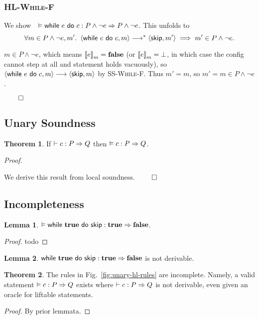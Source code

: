 \documentclass[10pt]{article}
\theoremstyle{definition}
\newtheorem{theorem}{Theorem}
\newtheorem{lemma}{Lemma}
\begin{document}
\subsubsection*{\textsc{HL-While-F}}
We show~~$\VAL \Triple \While e do c : P \wedge \neg e => P \wedge \neg e$.
This unfolds to
$$\forall m \in P \wedge \neg e, m'.\
\Cfg(\While e do c,m) \sstepstotrans \Cfg(\Skip,m') \implies
m' \in P \wedge \neg e.$$

$m \in P \wedge \neg e$, which means $\Eval(e,m) = \False$
(or $\Eval(e,m) = \bot$, in which case the config cannot step at all and statement holds vacuously),
so $\Cfg(\While e do c,m) \sstepsto \Cfg(\Skip,m)$ by \textsc{SS-While-F}.
Thus $m' = m$, so $m' = m \in P \wedge \neg e$.


\hfill $\qed$

\subsection*{Unary Soundness}
\begin{theorem}
If $\DER \Triple c : P => Q$ then $\VAL \Triple c : P => Q$.
\end{theorem}

\noindent
\emph{Proof.}

\noindent
We derive this result from local soundness.
\hfill $\qed$


\subsection{Incompleteness}

\begin{lemma}
    $\VAL \Triple {\While {\True} do {\Skip} } : \True => \False$.
\end{lemma}
\begin{proof}
    todo
\end{proof}

\begin{lemma}
    $\Triple {\While {\True} do {\Skip} } : \True => \False$ is not derivable.
\end{lemma}

\begin{theorem}
    The rules in Fig.~\ref{fig:unary-hl-rules}
    are incomplete. Namely, a valid statement $\VAL\Triple c : P => Q$ exists where $\DER \Triple c : P => Q$ is not derivable, even given an oracle for liftable statements.
\end{theorem}
\begin{proof}
By prior lemmata.
\end{proof}
\end{document}
